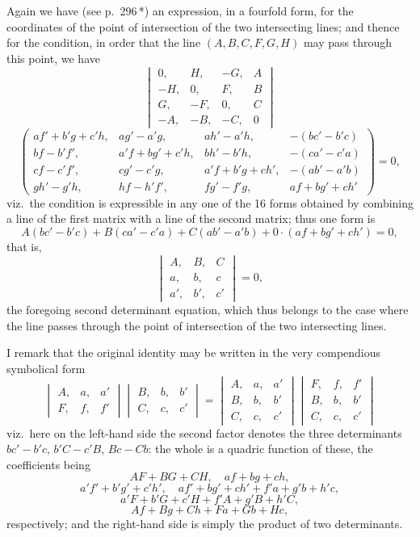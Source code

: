 \documentclass[11pt,a4paper]{article}
\begin{document}
\medskip
Again we have (see p.\ 296\,*) an expression, in a fourfold form, for the coordinates of the point of intersection of the two intersecting lines; and thence for the condition, in order that the line $(A, B, C, F, G, H)$ may pass through this point, we have
\[
\begin{vmatrix} 0, & H, & -G, & A \\ -H, & 0, & F, & B \\ G, & -F, & 0, & C \\ -A, & -B, & -C, & 0 \end{vmatrix}
\]
\[
\left(\begin{array}{cccc}
af' + b'g + c'h, & ag' - a'g, & ah' - a'h, & -(bc' - b'c) \\
bf - b'f', & a'f + bg' + c'h, & bh' - b'h, & -(ca' - c'a) \\
cf - c'f', & cg' - c'g, & a'f + b'g + ch', & -(ab' - a'b) \\
gh' - g'h, & hf - h'f', & fg' - f'g, & af + bg' + ch'
\end{array}\right) = 0,
\]
viz.\ the condition is expressible in any one of the 16 forms obtained by combining a line of the first matrix with a line of the second matrix; thus one form is
\[
A(bc' - b'c) + B(ca' - c'a) + C(ab' - a'b) + 0 \cdot (af + bg' + ch') = 0,
\]
that is,
\[
\begin{vmatrix} A, & B, & C \\ a, & b, & c \\ a', & b', & c' \end{vmatrix} = 0,
\]
the foregoing second determinant equation, which thus belongs to the case where the line passes through the point of intersection of the two intersecting lines.

I remark that the original identity may be written in the very compendious symbolical form
\[
\begin{vmatrix} A, & a, & a' \\ F, & f, & f' \end{vmatrix} \begin{vmatrix} B, & b, & b' \\ C, & c, & c' \end{vmatrix} = \begin{vmatrix} A, & a, & a' \\ B, & b, & b' \\ C, & c, & c' \end{vmatrix} \begin{vmatrix} F, & f, & f' \\ B, & b, & b' \\ C, & c, & c' \end{vmatrix}
\]
viz.\ here on the left-hand side the second factor denotes the three determinants $bc' - b'c$, $b'C - c'B$, $Bc - Cb$: the whole is a quadric function of these, the coefficients being
\[
AF + BG + CH,\quad af + bg + ch,
\]
\[
a'f' + b'g' + c'h',\quad af' + bg' + ch' + f'a + g'b + h'c,
\]
\[
a'F + b'G + c'H + f'A + g'B + h'C,
\]
\[
Af + Bg + Ch + Fa + Gb + Hc,
\]
respectively; and the right-hand side is simply the product of two determinants.
\end{document}
